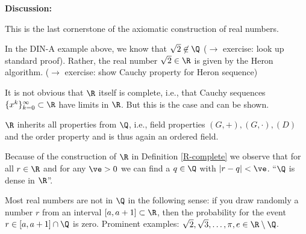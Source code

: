 {{\bf Discussion:} 
\ite
\item This is the last cornerstone of the axiomatic construction of real numbers. 
\item In the DIN-A example above, we know that $\sqrt{2}\not\in\Q$ ($\rightarrow$ exercise: look up standard proof). Rather, the real number  $\sqrt{2}\in\R$ is given by the Heron algorithm. ($\rightarrow$ exercise: show Cauchy property for Heron sequence)
\item It is not obvious that $\R$ itself is complete, i.e., that Cauchy sequences $\{x^k\}_{k=0}^\infty\subset\R$ have limits in $\R$. But this is the case and can be shown.
\item $\R$ inherits all properties from $\Q$, i.e., field properties $(G,+), (G,\cdot), (D)$ and the order property and is thus again an ordered field.
\item Because of the construction of $\R$ in Definition \ref{R-complete} we observe that for all $r\in\R$ and for any $\ve>0$ we can find a $q\in\Q$ with
$|r-q|<\ve$. ``$\Q$ is dense in $\R$''.
\item Most real numbers are not in $\Q$ in the following sense: if you draw randomly a number $r$ from an interval $[a,a+1]\subset\R$, then the probability for the event $r\in [a,a+1]\cap\Q$ is zero. Prominent examples: $\sqrt{2}, \sqrt{3},\ldots, \pi, e\in\R\setminus\Q$.
\eti


}





 






